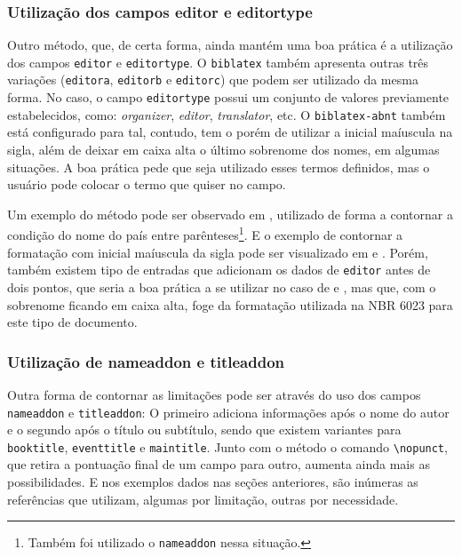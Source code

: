 \subsubsection{Utilização dos campos editor e editortype}
Outro método, que, de certa forma, ainda mantém uma boa prática é a utilização dos campos \texttt{editor} e \texttt{editortype}. O \texttt{biblatex} também apresenta outras três variações (\texttt{editora}, \texttt{editorb} e \texttt{editorc}) que podem ser utilizado da mesma forma. No caso, o campo \texttt{editortype} possui um conjunto de valores previamente estabelecidos, como: \textit{organizer}, \textit{editor}, \textit{translator}, etc. O \texttt{biblatex-abnt} também está configurado para tal, contudo, tem o porém de utilizar a inicial maíuscula na sigla, além de deixar em caixa alta o último sobrenome dos nomes, em algumas situações. A boa prática pede que seja utilizado esses termos definidos, mas o usuário pode colocar o termo que quiser no campo.

Um exemplo do método pode ser observado em \textcite{parte:ex1}, utilizado de forma a contornar a condição do nome do país entre parênteses\footnote{Também foi utilizado o \texttt{nameaddon} nessa situação.}. E o exemplo de contornar a formatação com inicial maíuscula da sigla pode ser visualizado em \textcite{parte:ex2} e \textcite{livro:iffar-guia-normalizacao-2022}. Porém, também existem tipo de entradas que adicionam os dados de \texttt{editor} antes de dois pontos, que seria a boa prática a se utilizar no caso de \textcite{filme:bee-movie} e \textcite{serie:grande-familia}, mas que, com o sobrenome ficando em caixa alta, foge da formatação utilizada na NBR 6023 para este tipo de documento.

\subsubsection{Utilização de nameaddon e titleaddon}
Outra forma de contornar as limitações pode ser através do uso dos campos \texttt{nameaddon} e \texttt{titleaddon}: O primeiro adiciona informações após o nome do autor e o segundo após o título ou subtítulo, sendo que existem variantes para \texttt{booktitle}, \texttt{eventtitle} e \texttt{maintitle}. Junto com o método o comando \verb|\nopunct|, que retira a pontuação final de um campo para outro, aumenta ainda mais as possibilidades. E nos exemplos dados nas seções anteriores, são inúmeras as referências que utilizam, algumas por limitação, outras por necessidade.

